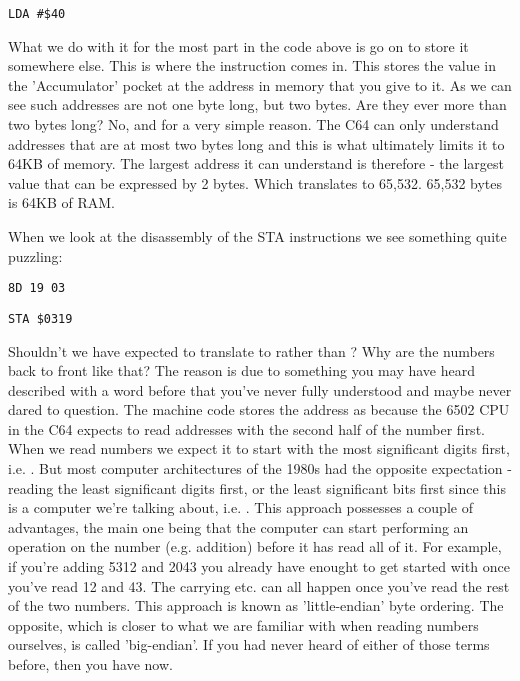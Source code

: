 \begin{lstlisting}[caption=Loading the byte \$40 to the \icode{Accumulator}.]
LDA #$40
\end{lstlisting}

What we do with it for the most part in the code above is go on to store it somewhere else. This is where
the  instruction comes in. This stores the value in the 'Accumulator' pocket at the address
in memory that you give to it. As we can see such addresses are not one byte long, but two bytes. Are they
ever more than two bytes long? No, and for a very simple reason. The C64 can only understand addresses
that are at most two bytes long and this is what ultimately limits it to 64KB of memory. The largest address it can understand
is therefore  - the largest value that can be expressed by 2 bytes. Which translates to 65,532.
65,532 bytes is 64KB of RAM. 

When we look at the disassembly of the STA instructions we see something quite puzzling:

\begin{minipage}[b]{0.45\linewidth}
\centering
\begin{lstlisting}
8D 19 03
\end{lstlisting}
\end{minipage}
\hspace{0.5cm}
\begin{minipage}[b]{0.45\linewidth}
\centering
\begin{lstlisting}
STA $0319
\end{lstlisting}
\end{minipage}

Shouldn't we have expected  to translate to  rather than 
? Why are the numbers back to front like that? The reason is due to something
you may have heard described with a word before that you've never fully understood and maybe never
dared to question. The machine code
stores the address  as  because the 6502 CPU in the C64 expects to read
addresses with the second half of the number first. When we read numbers we expect it to start
with the most significant digits first, i.e. . But most computer architectures of the 1980s had the opposite
expectation - reading the least significant digits first, or the least significant bits first since
this is a computer we're talking about, i.e. . This approach possesses a couple of advantages,
the main one being that the computer can start performing an operation on the number (e.g. addition) before it
has read all of it. For example, if you're adding 5312 and 2043 you already have enought to get started with once
you've read 12 and 43. The carrying etc. can all happen once you've read the rest of the two numbers. This approach
is known as 'little-endian' byte ordering. The opposite, which is closer to what we are familiar with when
reading numbers ourselves, is called 'big-endian'. If you had never heard of either of those terms before, then
you have now.

